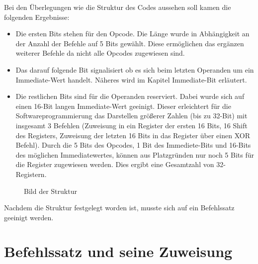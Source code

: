 \documentclass[paper=a4,fontsize=12pt,twocolumn]{scrreprt}
\begin{document}
Bei den Überlegungen wie die Struktur des Codes aussehen soll kamen die folgenden Ergebnisse: 
\begin{itemize}
    \item Die ersten Bits stehen für den Opcode.
    Die Länge wurde in Abhängigkeit an der Anzahl der Befehle auf 5 Bits gewählt.
    Diese ermöglichen das ergänzen weiterer Befehle da nicht alle Opcodes zugewiesen sind. 
    \item Das darauf folgende Bit signalisiert ob es sich beim letzten Operanden um ein Immediate-Wert handelt.
    Näheres wird im Kapitel Immediate-Bit erläutert.
    \item Die restlichen Bits sind für die Operanden reserviert.
    Dabei wurde sich auf einen 16-Bit langen Immediate-Wert geeinigt.
    Dieser erleichtert für die  Softwareprogrammierung das Darstellen größerer Zahlen (bis zu 32-Bit) mit insgesamt 3 Befehlen (Zuweisung in ein Register der ersten 16 Bits, 16 Shift des Registers, Zuweisung der letzten 16 Bits in das Register über einen XOR Befehl).
    Durch die 5 Bits des Opcodes, 1 Bit des Immediete-Bits und 16-Bits des möglichen Immediatewertes, können aus Platzgründen nur noch 5 Bits für die Register zugewiesen werden.
    Dies ergibt eine Gesamtzahl von 32-Registern.
\end{itemize}

\begin{figure}[h]
\centering
\caption{Bild der Struktur}
\end{figure}

Nachdem die Struktur festgelegt worden ist, musste sich auf ein Befehlssatz geeinigt werden.

\section{Befehlssatz und seine Zuweisung}
\end{document}
